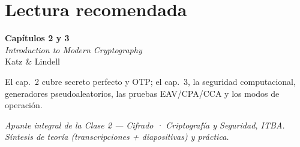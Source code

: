 \documentclass[11pt,a4paper]{article}
\begin{document}
\section*{Lectura recomendada}
\begin{center}
\begin{tcolorbox}[enhanced,colback=itbaBlue!20,colframe=itbaCyanDark,boxrule=1pt,
  arc=3pt,width=0.85\textwidth,halign=center]
\large\textbf{Capítulos 2 y 3}\\[4pt]
\emph{Introduction to Modern Cryptography}\\[2pt]
Katz \& Lindell
\end{tcolorbox}
\end{center}
\noindent El cap.\ 2 cubre secreto perfecto y OTP; el cap.\ 3, la seguridad
computacional, generadores pseudoaleatorios, las pruebas EAV/CPA/CCA y los modos de
operación.

\vfill
\begin{center}\small\itshape\color{black!60}
Apunte integral de la Clase 2 — Cifrado · Criptografía y Seguridad, ITBA.\\
Síntesis de teoría (transcripciones + diapositivas) y práctica.
\end{center}
\end{document}
